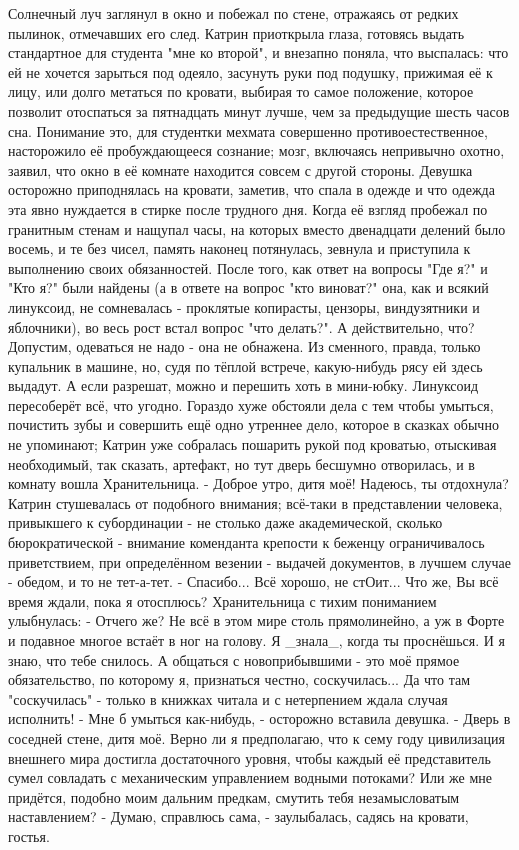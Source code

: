 Солнечный луч заглянул в окно и побежал по стене, отражаясь от редких пылинок, отмечавших его след. Катрин приоткрыла глаза, готовясь выдать стандартное для студента "мне ко второй", и внезапно поняла, что выспалась: что ей не хочется зарыться под одеяло, засунуть руки под подушку, прижимая её к лицу, или долго метаться по кровати, выбирая то самое положение, которое позволит отоспаться за пятнадцать минут лучше, чем за предыдущие шесть часов сна. Понимание это, для студентки мехмата совершенно противоестественное, насторожило её пробуждающееся сознание; мозг, включаясь непривычно охотно, заявил, что окно в её комнате находится совсем с другой стороны. Девушка осторожно приподнялась на кровати, заметив, что спала в одежде и что одежда эта явно нуждается в стирке после трудного дня. Когда её взгляд пробежал по гранитным стенам и нащупал часы, на которых вместо двенадцати делений было восемь, и те без чисел, память наконец потянулась, зевнула и приступила к выполнению своих обязанностей.
После того, как ответ на вопросы "Где я?" и "Кто я?" были найдены (а в ответе на вопрос "кто виноват?" она, как и всякий линуксоид, не сомневалась - проклятые копирасты, цензоры, виндузятники и яблочники), во весь рост встал вопрос "что делать?".
А действительно, что? Допустим, одеваться не надо - она не обнажена. Из сменного, правда, только купальник в машине, но, судя по тёплой встрече, какую-нибудь рясу ей здесь выдадут. А если разрешат, можно и перешить хоть в мини-юбку. Линуксоид пересоберёт всё, что угодно.
Гораздо хуже обстояли дела с тем чтобы умыться, почистить зубы и совершить ещё одно утреннее дело, которое в сказках обычно не упоминают; Катрин уже собралась пошарить рукой под кроватью, отыскивая необходимый, так сказать, артефакт, но тут дверь бесшумно отворилась, и в комнату вошла Хранительница.
 - Доброе утро, дитя моё! Надеюсь, ты отдохнула?
Катрин стушевалась от подобного внимания; всё-таки в представлении человека, привыкшего к субординации - не столько даже академической, сколько бюрократической - внимание коменданта крепости к беженцу ограничивалось приветствием, при определённом везении - выдачей документов, в лучшем случае - обедом, и то не тет-а-тет.
 - Спасибо... Всё хорошо, не стОит... Что же, Вы всё время ждали, пока я отосплюсь?
Хранительница с тихим пониманием улыбнулась:
 - Отчего же? Не всё в этом мире столь прямолинейно, а уж в Форте и подавное многое встаёт в ног на голову. Я \_знала\_, когда ты проснёшься. И я знаю, что тебе снилось. А общаться с новоприбывшими - это моё прямое обязательство, по которому я, признаться честно, соскучилась... Да что там "соскучилась" - только в книжках читала и с нетерпением ждала случая исполнить!
 - Мне б умыться как-нибудь, - осторожно вставила девушка.
 - Дверь в соседней стене, дитя моё. Верно ли я предполагаю, что к сему году цивилизация внешнего мира достигла достаточного уровня, чтобы каждый её представитель сумел совладать с механическим управлением водными потоками? Или же мне придётся, подобно моим дальним предкам, смутить тебя незамысловатым наставлением?
 - Думаю, справлюсь сама, - заулыбалась, садясь на кровати, гостья.

